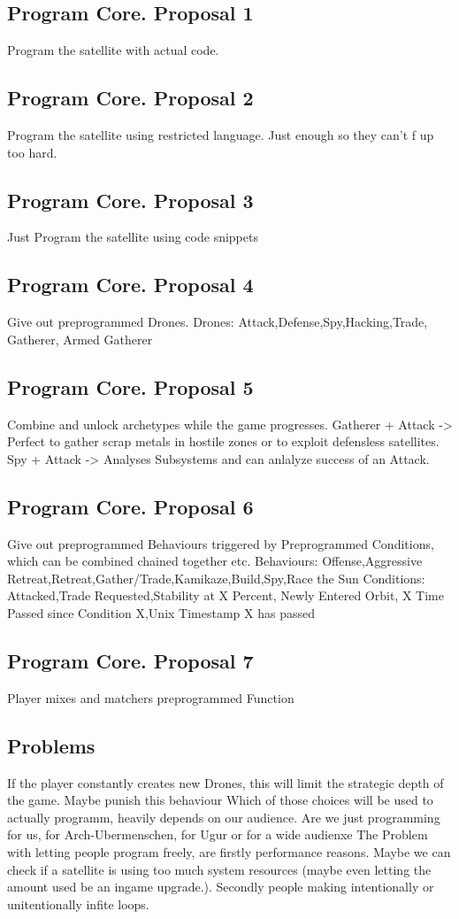 \documentclass[a4paper]{scrreprt}
\begin{document}
        \subsection{Program Core. Proposal 1}
             Program the satellite with actual code.
        \subsection{Program Core. Proposal 2}
            Program the satellite using restricted language.
            Just enough so they can't f up too hard.
        \subsection{Program Core. Proposal 3}
            Just Program the satellite using code snippets
        \subsection{Program Core. Proposal 4}
            Give out preprogrammed Drones.
            Drones: Attack,Defense,Spy,Hacking,Trade, Gatherer, Armed Gatherer
        \subsection{Program Core. Proposal 5}
            Combine and unlock archetypes while the game progresses.
            Gatherer + Attack -> Perfect to gather scrap metals in hostile zones or to exploit defensless satellites. 
            Spy + Attack -> Analyses Subsystems and can anlalyze success of an Attack. 
        \subsection{Program Core. Proposal 6}
            Give out preprogrammed Behaviours triggered by Preprogrammed Conditions, which can be combined chained together etc.
            Behaviours: Offense,Aggressive Retreat,Retreat,Gather/Trade,Kamikaze,Build,Spy,Race the Sun
            Conditions: Attacked,Trade Requested,Stability at X Percent, Newly Entered Orbit, X Time Passed since Condition X,Unix Timestamp X has passed
        \subsection{Program Core. Proposal 7}
        Player mixes and matchers preprogrammed Function
        \subsection{Problems}
        If the player constantly creates new Drones, this will limit the strategic depth of the game. Maybe punish this behaviour
        Which of those choices will be used to actually programm, heavily depends on our audience. Are we just programming for us, for Arch-Ubermenschen, for Ugur or for a wide audienxe
        The Problem with letting people program freely, are firstly performance reasons. Maybe we can check if a satellite is using too much system resources (maybe even letting the amount used be an ingame upgrade.). Secondly people making intentionally or unitentionally infite loops.
\end{document}
